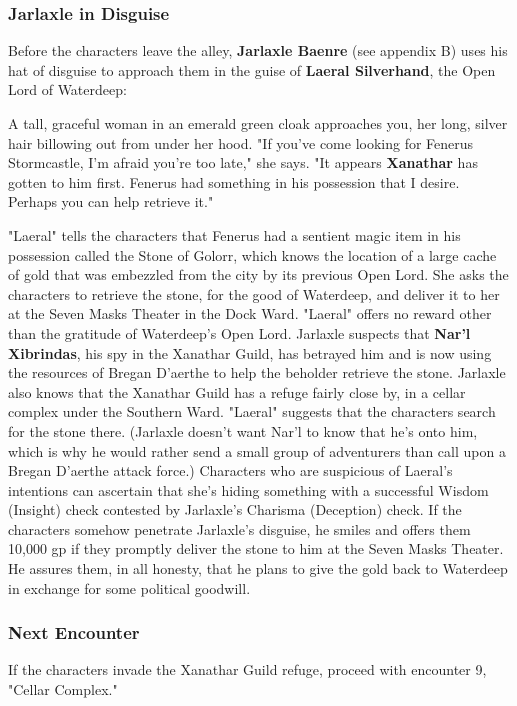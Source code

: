 \documentclass[10pt,a4paper,twoside,twocolumn,openany,nodeprecatedcode]{dndbook}
\begin{document}
\subsubsection{Jarlaxle in Disguise}
Before the characters leave the alley, \textbf{Jarlaxle Baenre} (see appendix B) uses his hat of disguise to approach them in the guise of \textbf{Laeral Silverhand}, the Open Lord of Waterdeep:
\begin{DndReadAloud}{}
A tall, graceful woman in an emerald green cloak approaches you, her long, silver hair billowing out from under her hood. "If you've come looking for Fenerus Stormcastle, I'm afraid you're too late," she says. "It appears \textbf{Xanathar} has gotten to him first. Fenerus had something in his possession that I desire. Perhaps you can help retrieve it."
\end{DndReadAloud}

"Laeral" tells the characters that Fenerus had a sentient magic item in his possession called the Stone of Golorr, which knows the location of a large cache of gold that was embezzled from the city by its previous Open Lord. She asks the characters to retrieve the stone, for the good of Waterdeep, and deliver it to her at the Seven Masks Theater in the Dock Ward. "Laeral" offers no reward other than the gratitude of Waterdeep's Open Lord.
Jarlaxle suspects that \textbf{Nar'l Xibrindas}, his spy in the Xanathar Guild, has betrayed him and is now using the resources of Bregan D'aerthe to help the beholder retrieve the stone. Jarlaxle also knows that the Xanathar Guild has a refuge fairly close by, in a cellar complex under the Southern Ward. "Laeral" suggests that the characters search for the stone there. (Jarlaxle doesn't want Nar'l to know that he's onto him, which is why he would rather send a small group of adventurers than call upon a Bregan D'aerthe attack force.)
Characters who are suspicious of Laeral's intentions can ascertain that she's hiding something with a successful Wisdom (Insight) check contested by Jarlaxle's Charisma (Deception) check. If the characters somehow penetrate Jarlaxle's disguise, he smiles and offers them 10,000 gp if they promptly deliver the stone to him at the Seven Masks Theater. He assures them, in all honesty, that he plans to give the gold back to Waterdeep in exchange for some political goodwill.
\subsubsection{Next Encounter}
If the characters invade the Xanathar Guild refuge, proceed with encounter 9, "Cellar Complex."
\end{document}

